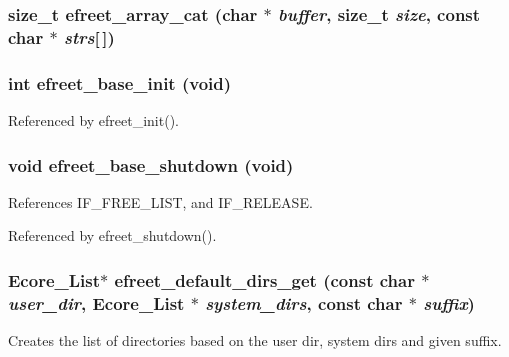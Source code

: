 \subsubsection{\setlength{\rightskip}{0pt plus 5cm}size\_\-t efreet\_\-array\_\-cat (char $\ast$ {\em buffer}, \/  size\_\-t {\em size}, \/  const char $\ast$ {\em strs}[$\,$])}\label{group__Efreet__Private_ge567e8f87e24148d9a37fa81626c1cc9}


\subsubsection{\setlength{\rightskip}{0pt plus 5cm}int efreet\_\-base\_\-init (void)}\label{group__Efreet__Private_gd419150d5b580bc0b63cdc1c8a4fcd99}




Referenced by efreet\_\-init().
\subsubsection{\setlength{\rightskip}{0pt plus 5cm}void efreet\_\-base\_\-shutdown (void)}\label{group__Efreet__Private_gcd160bc890524bdac0f9bf043f4ddbbd}




References IF\_\-FREE\_\-LIST, and IF\_\-RELEASE.

Referenced by efreet\_\-shutdown().
\subsubsection{\setlength{\rightskip}{0pt plus 5cm}Ecore\_\-List$\ast$ efreet\_\-default\_\-dirs\_\-get (const char $\ast$ {\em user\_\-dir}, \/  Ecore\_\-List $\ast$ {\em system\_\-dirs}, \/  const char $\ast$ {\em suffix})}\label{group__Efreet__Private_g35c792e4c087a1ca5ed74c70910cc523}


Creates the list of directories based on the user dir, system dirs and given suffix. 

